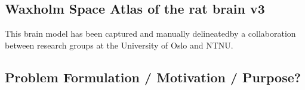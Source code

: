 \subsection*{Waxholm Space Atlas of the rat brain v3}\label{chap:ratbrain}
This brain model has been captured and manually delineated\footnotemark by a collaboration between research groups at the University of Oslo and NTNU.



\subsection[Motivation]{Problem Formulation / Motivation / Purpose?}

